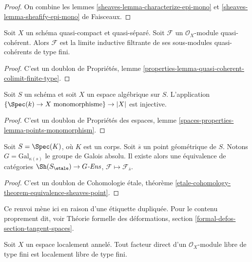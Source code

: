 \begin{proof}
On combine les lemmes \ref{sheaves-lemma-characterize-epi-mono} et
\ref{sheaves-lemma-sheafify-epi-mono} de Faisceaux.
\end{proof}

\begin{lemma}
\label{lemma-directed-colimit-finite-type}
Soit $X$ un schéma quasi-compact et quasi-séparé.
Soit $\mathcal{F}$ un $\mathcal{O}_X$-module quasi-cohérent.
Alors $\mathcal{F}$ est la limite inductive filtrante de ses sous-modules
quasi-cohérents de type fini.
\end{lemma}

\begin{proof}
C'est un doublon de Propriétés, lemme
\ref{properties-lemma-quasi-coherent-colimit-finite-type}.
\end{proof}

\begin{lemma}
\label{lemma-points-monomorphism}
Soit $S$ un schéma et soit $X$ un espace algébrique sur $S$.
L'application $\{\Spec(k) \to X \text{ monomorphisme}\} \to |X|$ est injective.
\end{lemma}

\begin{proof}
C'est un doublon de Propriétés des espaces, lemme
\ref{spaces-properties-lemma-points-monomorphism}.
\end{proof}

\begin{theorem}
\label{theorem-equivalence-sheaves-point}
Soit $S = \Spec(K)$, où $K$ est un corps.
Soit $\overline{s}$ un point géométrique de $S$.
Notons $G = \text{Gal}_{\kappa(s)}$ le groupe de Galois absolu.
Il existe alors une équivalence de catégories
$\Sh(S_\etale) \to G\textit{-Ens}$,
$\mathcal{F} \mapsto \mathcal{F}_{\overline{s}}$.
\end{theorem}

\begin{proof}
C'est un doublon de Cohomologie \'etale, théorème
\ref{etale-cohomology-theorem-equivalence-sheaves-point}.
\end{proof}

\begin{remark}
\label{remark-tangent-spaces}
Ce renvoi mène ici en raison d'une étiquette dupliquée. Pour le contenu
proprement dit, voir Théorie formelle des déformations, section
\ref{formal-defos-section-tangent-spaces}.
\end{remark}

\begin{lemma}
\label{lemma-locally-ringed-space-direct-summand-free}
Soit $X$ un espace localement annelé. Tout facteur direct d'un
$\mathcal{O}_X$-module libre de type fini est localement libre de type fini.
\end{lemma}

